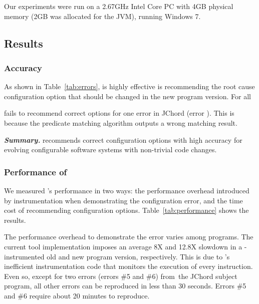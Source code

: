 Our experiments were run on a 2.67GHz Intel Core PC
with 4GB physical memory (2GB was allocated for the JVM),
running Windows 7.

\subsection{Results}

\subsubsection{Accuracy}
\label{sec:accuracy}

As shown in Table~\ref{tab:errors}, \ourtool is highly effective
is recommending the root cause configuration option that should
be changed in the new program version. For all 


\ourtool fails to recommend correct options for one error in
JChord (error ). This is because the predicate matching
algorithm outputs a wrong matching result.


\vspace{1mm}

\noindent \textbf{\textit{Summary.}} \ourtool
recommends correct configuration options with
high accuracy for evolving configurable software systems
with non-trivial code changes.

\subsubsection{Performance of \ourtool}
\label{sec:timecost}

We measured \ourtool's performance in two ways:
the performance overhead introduced by instrumentation
when demonstrating the configuration error,
and the time cost of recommending configuration options.
Table~\ref{tab:performance} shows the results.

The performance overhead to demonstrate the error
varies among programs. The current tool implementation
imposes an average 8X and 12.8X slowdown in a
\ourtool-instrumented old and new program version, respectively.
This is due to \ourtool's inefficient instrumentation code that
monitors the execution of every instruction.
Even so, except for two errors (errors \#5 and \#6) from\
the JChord subject program,  all other errors can
be reproduced in less than 30 seconds. Errors \#5 and \#6
require about 20 minutes to reproduce.

